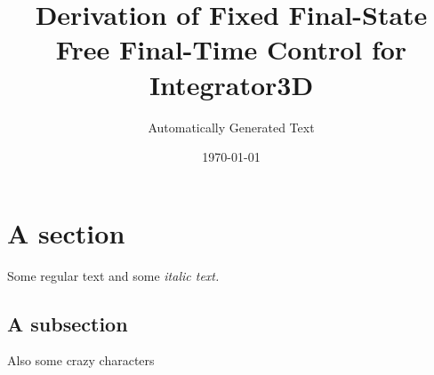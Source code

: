 \documentclass{article}%
\title{Derivation of Fixed Final{-}State Free Final{-}Time Control for Integrator3D}%
\author{Automatically Generated Text}%
\date{\today}%
\begin{document}
%
\normalsize%
\maketitle%
\section{A section}%
\label{sec:A section}%
Some regular text and some %
\textit{italic text.}%
\subsection{A subsection}%
\label{subsec:A subsection}%
Also some crazy characters

%
\end{document}
